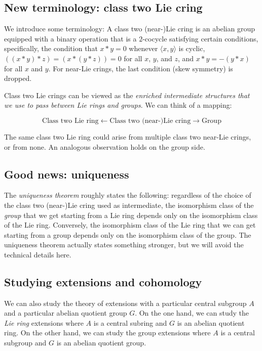\documentclass[10pt]{amsart}
\begin{document}
\subsection*{New terminology: class two Lie cring}

We introduce some terminology: A class two (near-)Lie cring is an
abelian group equipped with a binary operation that is a $2$-cocycle
satisfying certain conditions, specifically, the condition that $x * y
= 0$ whenever $\langle x,y \rangle$ is cyclic, $((x * y) * z) = (x *
(y * z)) = 0$ for all $x$, $y$, and $z$, and $x * y = -(y * x)$ for
all $x$ and $y$. For near-Lie crings, the last condition (skew
symmetry) is dropped.

Class two Lie crings can be viewed as the {\em enriched intermediate
structures that we use to pass between Lie rings and groups}. We can
think of a mapping:

$$\text{Class two Lie ring} \leftarrow \text{Class two (near-)Lie
cring} \rightarrow \text{Group}$$

The same class two Lie ring could arise from multiple class two
near-Lie crings, or from none. An analogous observation holds on the
group side.

\subsection*{Good news: uniqueness}

The {\em uniqueness theorem} roughly states the following: regardless
of the choice of the class two (near-)Lie cring used as intermediate,
the isomorphism class of the {\em group} that we get starting from a
Lie ring depends only on the isomorphism class of the Lie
ring. Conversely, the isomorphism class of the Lie ring that we can
get starting from a group depends only on the isomorphism class of the
group. The uniqueness theorem actually states something stronger, but
we will avoid the technical details here.

\subsection*{Studying extensions and cohomology}

We can also study the theory of extensions with a particular central
subgroup $A$ and a particular abelian quotient group $G$. On the one
hand, we can study the {\em Lie ring} extensions where $A$ is a
central subring and $G$ is an abelian quotient ring. On the other
hand, we can study the group extensions where $A$ is a central
subgroup and $G$ is an abelian quotient group.
\end{document}
